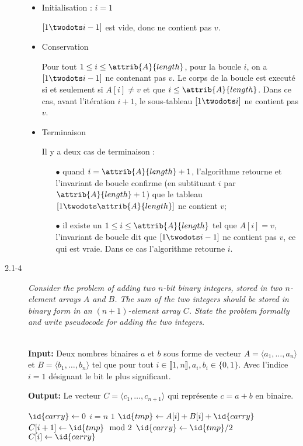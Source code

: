 \begin{description}
\begin{ex}
\begin{itemize}
  \item Initialisation : $i = 1$

    $[1 \twodots i-1]$ est vide, donc ne contient pas $v$.
  \item Conservation

    Pour tout $1\le i\le \attrib{A}{length}$, pour la boucle $i$, on a $[1 \twodots i-1]$ ne contenant pas $v$. Le corps de la boucle est execut\'e si et seulement si $A[i] \ne v$ et que $i \le \attrib{A}{length}$. Dans ce cas, avant l'it\'eration $i+1$, le sous-tableau $[1 \twodots i]$ ne contient pas $v$.
  \item Terminaison

    Il y a deux cas de terminaison :
    \begin{itemize}
      \item[$\bullet$]  quand $i = \attrib{A}{length}+ 1$, l'algorithme retourne  et l'invariant de boucle confirme (en subtituant $i$ par $\attrib{A}{length}+1$) que le tableau $[1 \twodots \attrib{A}{length}]$ ne contient $v$;
      \item[$\bullet$] il existe un $1 \le i \le \attrib{A}{length}$ tel que $A[i] = v$, l'invariant de boucle dit que $[ 1 \twodots i-1]$ ne contient pas $v$, ce qui est vraie. Dans ce cas l'algorithme retourne $i$.
    \end{itemize}
\end{itemize}

\end{ex}

\item[2.1-4] {\itshape Consider the problem of adding two $n$-bit binary integers, stored in two $n$-element arrays $A$ and $B$. The sum of the two integers should be stored in binary form in an $(n+1)$-element array $C$.  State the problem formally and write pseudocode for adding the two integers.}

  \begin{ex}\mbox{}\\
    {\bfseries Input:} Deux nombres binaires $a$ et $b$ sous forme de vecteur $A = \langle a_1, \ldots, a_n \rangle$ et $B = \langle b_1, \ldots, b_n \rangle$ tel que pour tout $i \in \llbracket 1,n \rrbracket, a_i, b_i \in \{0,1\}$. Avec l'indice $i=1$ d\'esignant le bit le plus significant.

    {\bfseries Output:} Le vecteur $C = \langle c_1, \ldots, c_{n+1} \rangle$ qui repr\'esente $c = a+b$ en binaire.
    
    \begin{codebox}
      \li $\id{carry} \gets 0 $
      \li \For $i=n$ \Downto $1$ \Do
      \li $\id{tmp} \gets A[i] + B[i] + \id{carry}$
      \li $C[i+1] \gets \id{tmp} \mod 2$
      \li $\id{carry} \gets \id{tmp}/2$\End
      \li $C[i] \gets \id{carry}$
    \end{codebox}
    

\end{ex}
\end{description}
